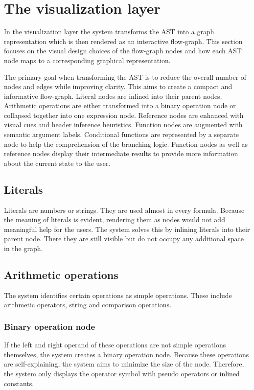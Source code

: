 \section{The visualization layer}
\label{sec:visualization-layer}
In the visualization layer the system transforms the AST into a graph representation which is then rendered as an interactive flow-graph. This section focuses on the visual design choices of the flow-graph nodes and how each AST node maps to a corresponding graphical representation. 

The primary goal when transforming the AST is to reduce the overall number of nodes and edges while improving clarity. This aims to create a compact and informative flow-graph. Literal nodes are inlined into their parent nodes. Arithmetic operations are either transformed into a binary operation node or collapsed together into one expression node. Reference nodes are enhanced with visual cues and header inference heuristics. Function nodes are augmented with semantic argument labels. Conditional functions are represented by a separate node to help the comprehension of the branching logic. Function nodes as well as reference nodes display their intermediate results to provide more information about the current state to the user.   

\subsection{Literals}
Literals are numbers or strings. They are used almost in every formula. Because the meaning of literals is evident, rendering them as nodes would not add meaningful help for the users. The system solves this by inlining literals into their parent node. There they are still visible but do not occupy any additional space in the graph.

\subsection{Arithmetic operations}
The system identifies certain operations as simple operations. These include arithmetic operators, string and comparison operations.
\subsubsection{Binary operation node}
If the left and right operand of these operations are not simple operations themselves, the system creates a binary operation node. Because these operations are self-explaining, the system aims to minimize the size of the node. Therefore, the system only displays the operator symbol with pseudo operators or inlined constants. 
